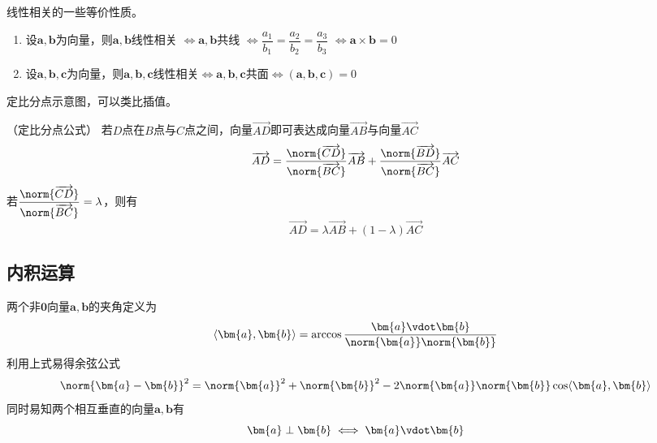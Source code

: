 \begin{theorem}
    线性相关的一些等价性质。
    \begin{enumerate}[(1)]
        \item 设$\bm{a},\bm{b}$为向量，则$\bm{a},\bm{b}$线性相关
              $\iff \bm{a},\bm{b}$共线
              $\iff \dfrac{a_1}{b_1}=\dfrac{a_2}{b_2}=\dfrac{a_3}{b_3}$
              $\iff \bm{a}\times\bm{b}=0$
        \item 设$\bm{a},\bm{b},\bm{c}$为向量，则$\bm{a},\bm{b},\bm{c}$线性相关$\iff\bm{a},\bm{b},\bm{c}$共面$\iff(\bm{a},\bm{b},\bm{c})=0$
    \end{enumerate}
\end{theorem}
\pagebreak
\begin{marginfigure}
    \centering
    \caption{定比分点示意图，可以类比插值。}
\end{marginfigure}
\begin{theorem}
    （定比分点公式）
    若$D$点在$B$点与$C$点之间，向量$\overrightarrow{AD}$即可表达成向量$\overrightarrow{AB}$与向量$\overrightarrow{AC}$
    \[ \overrightarrow{AD} = \frac{\norm{\overrightarrow{CD}}}{\norm{\overrightarrow{BC}}}\overrightarrow{AB} + \frac{\norm{\overrightarrow{BD}}}{\norm{\overrightarrow{BC}}}\overrightarrow{AC} \]
    若$\dfrac{\norm{\overrightarrow{CD}}}{\norm{\overrightarrow{BC}}} = \lambda$，则有
    \[ \overrightarrow{AD} = \lambda\overrightarrow{AB} + (1-\lambda)\overrightarrow{AC} \]
\end{theorem}

\subsection{内积运算}
两个非$\bm{0}$向量$\bm{a},\bm{b}$的夹角定义为
\begin{equation}
    \langle\bm{a},\bm{b}\rangle = \arccos \frac{\bm{a}\vdot\bm{b}}{\norm{\bm{a}} \norm{\bm{b}}}
\end{equation}
利用上式易得余弦公式
\begin{equation}
    \label{eq:余弦公式}
    \norm{\bm{a}-\bm{b}}^2 = \norm{\bm{a}}^2 + \norm{\bm{b}}^2 - 2\norm{\bm{a}}\norm{\bm{b}}\cos\langle\bm{a},\bm{b}\rangle
\end{equation}
同时易知两个相互垂直的向量$\bm{a},\bm{b}$有
\[ \bm{a}\perp\bm{b} \iff \bm{a}\vdot\bm{b} \]

